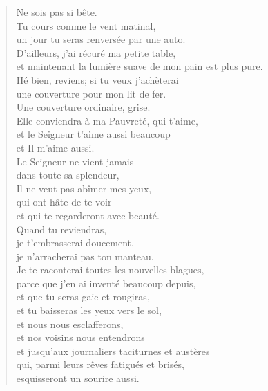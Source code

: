 \documentclass[11pt]{extbook}
\newcommand*{\centeredornament}{\centerline{\pgfornament[width=6cm]{88}}}
\begin{document}
\begin{verse}
  Ne sois pas si bête. \\
  Tu cours comme le vent matinal, \\
  un jour tu seras renversée par une auto. \\
  D'ailleurs, j'ai récuré ma petite table, \\
  et maintenant la lumière suave de mon pain est plus pure. \\
  Hé bien, reviens; si tu veux j'achèterai \\
  une couverture pour mon lit de fer. \\
  Une couverture ordinaire, grise. \\
  Elle conviendra à ma Pauvreté, qui t'aime, \\
  et le Seigneur t'aime aussi beaucoup \\
  et Il m'aime aussi. \\
  Le Seigneur ne vient jamais \\
  dans toute sa splendeur, \\
  Il ne veut pas abîmer mes yeux, \\
  qui ont hâte de te voir \\
  et qui te regarderont avec beauté. \\
  Quand tu reviendras, \\
  je t'embrasserai doucement, \\
  je n'arracherai pas ton manteau. \\
  Je te raconterai toutes les nouvelles blagues, \\
  parce que j'en ai inventé beaucoup depuis, \\
  et que tu seras gaie et rougiras, \\
  et tu baisseras les yeux vers le sol, \\
  et nous nous esclafferons, \\
  et nos voisins nous entendrons \\
  et jusqu'aux journaliers taciturnes et austères \\
  qui, parmi leurs rêves fatigués et brisés, \\
  esquisseront un sourire aussi.
\end{verse}

\newpage

\vspace*{-15mm}
\centeredornament


\end{document}
